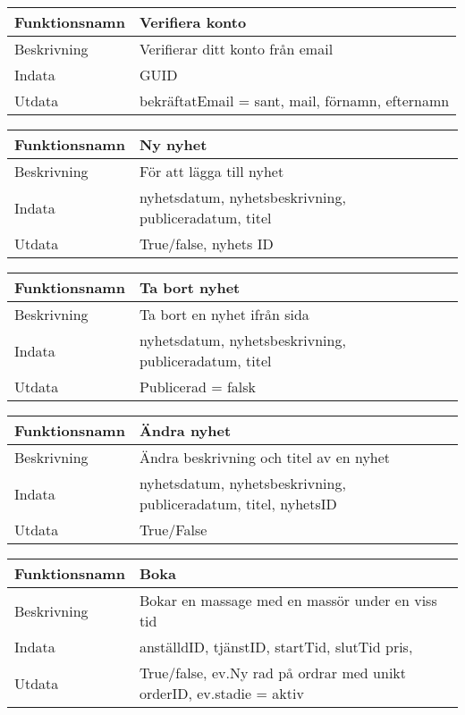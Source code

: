 \documentclass[11pt, titlepage, oneside, a4paper]{article}	%
\begin{document}
\begin{tabular}{ll}
\hline
Funktionsnamn & Verifiera konto                    \\ \hline
Beskrivning   & Verifierar ditt konto från email  \\ \hline
Indata        & GUID   \\ \hline
Utdata        & bekräftatEmail = sant, mail, förnamn, efternamn    \\ \hline
\end{tabular}

\begin{tabular}{ll}
\hline
Funktionsnamn & Ny nyhet                    \\ \hline
Beskrivning   & För att lägga till nyhet \\ \hline
Indata        & nyhetsdatum, nyhetsbeskrivning, publiceradatum, titel \\ \hline
Utdata        & True/false, nyhets ID              \\ \hline
\end{tabular}

\begin{tabular}{ll}
\hline
Funktionsnamn & Ta bort nyhet                   \\ \hline
Beskrivning   & Ta bort en nyhet ifrån sida \\ \hline
Indata        & nyhetsdatum, nyhetsbeskrivning, publiceradatum, titel \\ \hline
Utdata        & Publicerad = falsk            \\ \hline
\end{tabular}

\begin{tabular}{ll}
\hline
Funktionsnamn & Ändra nyhet                   \\ \hline
Beskrivning   & Ändra beskrivning och titel av en nyhet \\ \hline
Indata        & nyhetsdatum, nyhetsbeskrivning, publiceradatum, titel, nyhetsID \\ \hline
Utdata        & True/False            \\ \hline
\end{tabular}

\begin{tabular}{ll}
\hline
Funktionsnamn & Boka                  \\ \hline
Beskrivning   & Bokar en massage med en massör under en viss tid \\ \hline
Indata        & anställdID, tjänstID, startTid, slutTid pris, \\ \hline
Utdata        & True/false, ev.Ny rad på ordrar med unikt orderID, ev.stadie = aktiv            \\ \hline
\end{tabular}
\end{document}
